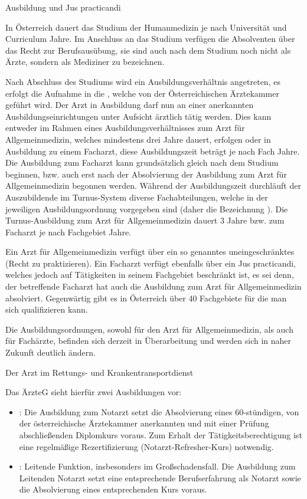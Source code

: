 \Text
{Ausbildung und Jus practicandi}
{In Österreich dauert das Studium der Humanmedizin je nach
Universität und Curriculum  Jahre. Im Anschluss an das
Studium verfügen die Absolventen  über das Recht zur
Berufsausübung, sie sind auch nach dem
Studium noch nicht als Ärzte, sondern als Mediziner zu
bezeichnen. 

Nach Abschluss des Studiums wird ein
Ausbildungsverhältnis angetreten, es erfolgt die Aufnahme in
die , welche von der Österreichischen
Ärztekammer geführt wird. Der Arzt in Ausbildung darf nun an
einer anerkannten Ausbildungseinrichtungen unter 
Aufsicht ärztlich tätig werden. Dies kann entweder im Rahmen
eines Ausbildungsverhältnisses zum Arzt für Allgemeinmedizin,
welches mindestens drei Jahre dauert, erfolgen oder in Ausbildung zu
einem Facharzt, diese Ausbildungszeit beträgt je nach Fach
 Jahre. Die Ausbildung zum Facharzt kann
grundsätzlich gleich nach dem Studium beginnen, bzw. auch erst nach der
Absolvierung der Ausbildung zum Arzt für Allgemeinmedizin
begonnen werden. Während der Ausbildungszeit durchläuft der
Auszubildende  im Turnus-System diverse
Fachabteilungen, welche in der jeweiligen Ausbildungsordnung
vorgegeben sind (daher die Bezeichnung
). Die Turnus-Ausbildung
zum Arzt für Allgemeinmedizin dauert 3 Jahre bzw. zum
Facharzt je nach Fachgebiet  Jahre. 

Ein Arzt für Allgemeinmedizin verfügt über ein so genanntes
uneingeschränktes  (Recht zu
praktizieren). Ein Facharzt verfügt ebenfalls über ein Jus
practicandi, welches jedoch auf Tätigkeiten in seinem
Fachgebiet beschränkt ist, es sei denn, der betreffende
Facharzt hat auch die Ausbildung zum Arzt für
Allgemeinmedizin absolviert. Gegenwärtig gibt es in
Österreich über 40 Fachgebiete für die man sich
qualifizieren kann.

Die Ausbildungsordnungen, sowohl für den Arzt für Allgemeinmedizin, 
als auch für Fachärzte, befinden sich derzeit in Überarbeitung und 
werden sich in naher Zukunft deutlich ändern.
}
{}
{}
{}
{}



\Text
{Der Arzt im Rettungs- und Krankentransportdienst}
{Das ÄrzteG sieht hierfür zwei Ausbildungen vor:
\begin{itemize}
  \item {}: Die Ausbildung zum Notarzt setzt die
  Absolvierung eines 60-stündigen, von der österreichische Ärztekammer anerkannten und mit einer
  Prüfung abschließenden Diplomkurs
  voraus.
  Zum Erhalt der
  Tätigkeitsberechtigung ist eine regelmäßige
  Rezertifizierung (Notarzt-Refresher-Kurs) notwendig.
  \item {}: Leitende Funktion, insbesonders 
  im Großschadensfall. Die Ausbildung zum Leitenden Notarzt setzt
  eine entsprechende Berufserfahrung als Notarzt sowie die
  Absolvierung eines entsprechenden Kurs voraus.
\end{itemize}

}
{}
{}
{}
{}







